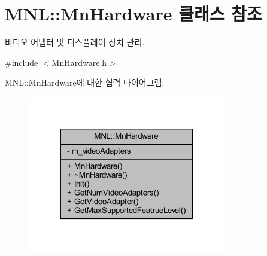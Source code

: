 \hypertarget{class_m_n_l_1_1_mn_hardware}{}\section{M\+NL\+:\+:Mn\+Hardware 클래스 참조}
\label{class_m_n_l_1_1_mn_hardware}


비디오 어댑터 및 디스플레이 장치 관리.  




{\ttfamily \#include $<$Mn\+Hardware.\+h$>$}



M\+NL\+:\+:Mn\+Hardware에 대한 협력 다이어그램\+:\nopagebreak
\begin{figure}[H]
\begin{center}
\leavevmode
\includegraphics[width=245pt]{class_m_n_l_1_1_mn_hardware__coll__graph}
\end{center}
\end{figure}
